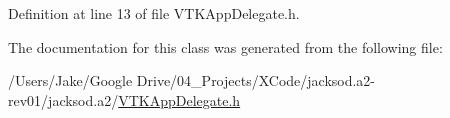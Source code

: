 Definition at line 13 of file V\+T\+K\+App\+Delegate.\+h.



The documentation for this class was generated from the following file\+:\begin{DoxyCompactItemize}
\item 
/\+Users/\+Jake/\+Google Drive/04\+\_\+\+Projects/\+X\+Code/jacksod.\+a2-\/rev01/jacksod.\+a2/\hyperlink{_v_t_k_app_delegate_8h}{V\+T\+K\+App\+Delegate.\+h}\end{DoxyCompactItemize}
